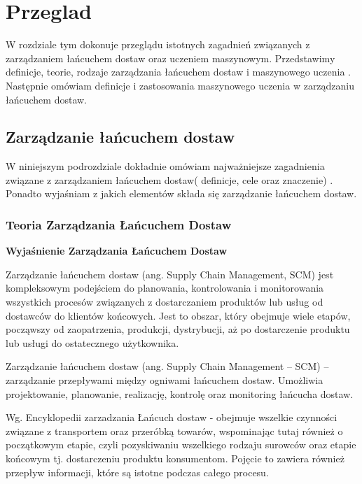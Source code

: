\newpage %
\section{Przeglad }
W rozdziale tym dokonuje przeglądu istotnych zagadnień związanych z zarządzaniem łańcuchem dostaw oraz uczeniem maszynowym. Przedstawimy definicje, teorie, rodzaje  zarządzania łańcuchem dostaw  i maszynowego uczenia . Następnie omówiam definicje i zastosowania maszynowego uczenia w zarządzaniu łańcuchem dostaw.


\subsection{Zarządzanie łańcuchem dostaw}
W niniejszym podrozdziale dokładnie omówiam najważniejsze zagadnienia związane z zarządzaniem łańcuchem dostaw( definicje, cele oraz znaczenie) . Ponadto wyjaśniam z jakich elementów składa się zarządzanie łańcuchem dostaw.

\vspace{\baselineskip}
\subsubsection{Teoria Zarządzania Łańcuchem Dostaw} 
\vspace{\baselineskip}
\textbf{Wyjaśnienie Zarządzania Łańcuchem Dostaw }

Zarządzanie łańcuchem dostaw (ang. Supply Chain Management, SCM) jest kompleksowym podejściem do planowania, kontrolowania i monitorowania wszystkich procesów związanych z dostarczaniem produktów lub usług od dostawców do klientów końcowych. Jest to obszar, który obejmuje wiele etapów, począwszy od zaopatrzenia, produkcji, dystrybucji, aż po dostarczenie produktu lub usługi do ostatecznego użytkownika.

Zarządzanie łańcuchem dostaw (ang. Supply Chain Management – SCM) – zarządzanie przepływami między ogniwami łańcuchem dostaw. Umożliwia projektowanie, planowanie, realizację, kontrolę oraz monitoring łańcucha dostaw. \cite{wik2023}



Wg. Encyklopedii zarzadzania Łańcuch dostaw - obejmuje wszelkie czynności związane z transportem oraz przeróbką towarów, wspominając tutaj również o początkowym etapie, czyli pozyskiwaniu wszelkiego rodzaju surowców oraz etapie końcowym tj. dostarczeniu produktu konsumentom. Pojęcie to zawiera również przepływ informacji, które są istotne podczas całego procesu. \cite{zarz2023}

